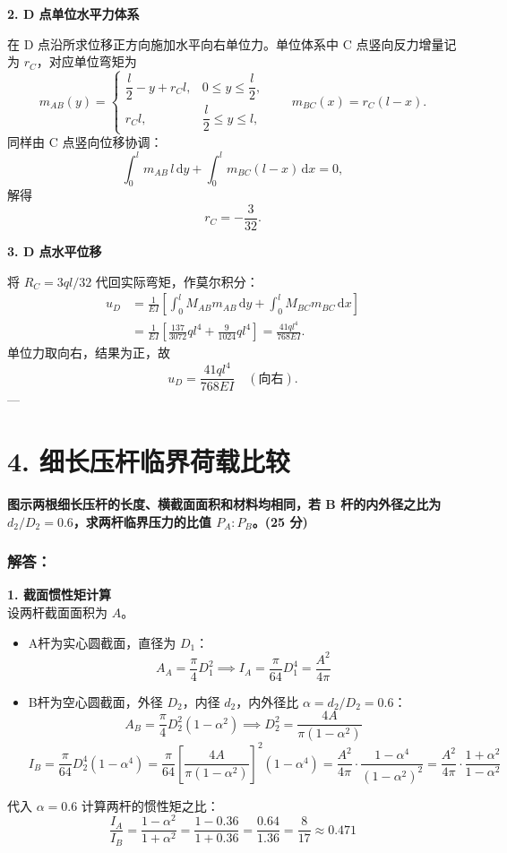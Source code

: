 \documentclass[11pt,a4paper]{ctexrep}
\newcommand{\diff}{\,\mathrm{d}}
\begin{document}
{\textbf{2. D 点单位水平力体系}

在 D 点沿所求位移正方向施加水平向右单位力。单位体系中 C 点竖向反力增量记为 $r_C$，对应单位弯矩为
\[
    m_{AB}(y)=
    \begin{cases}
        \dfrac l2-y+r_C l, & 0\le y\le \dfrac l2,\\[4pt]
        r_C l, & \dfrac l2\le y\le l,
    \end{cases}
    \qquad
    m_{BC}(x)=r_C(l-x).
\]
同样由 C 点竖向位移协调：
\[
\int_0^l m_{AB}\,l\diff y+\int_0^l m_{BC}(l-x)\diff x=0,
\]
解得
\[
    r_C=-\frac{3}{32}.
\]

\textbf{3. D 点水平位移}

将 $R_C=3ql/32$ 代回实际弯矩，作莫尔积分：
\[
\begin{aligned}
u_D
&=\frac1{EI}\left[
\int_0^l M_{AB}m_{AB}\diff y+
\int_0^l M_{BC}m_{BC}\diff x
\right]\\
&=\frac1{EI}\left[
\frac{137}{3072}ql^4+\frac{9}{1024}ql^4
\right]
=\frac{41ql^4}{768EI}.
\end{aligned}
\]
单位力取向右，结果为正，故
\[
    u_D=\frac{41ql^4}{768EI}\quad(\text{向右}).
\]
---

\section*{4. 细长压杆临界荷载比较}

\textbf{图示两根细长压杆的长度、横截面面积和材料均相同，若 B 杆的内外径之比为 $d_2/D_2 = 0.6$，求两杆临界压力的比值 $P_A : P_B$。(25 分)}

\subsubsection*{解答：}

\textbf{1. 截面惯性矩计算} \\
设两杆截面面积为 $A$。
\begin{itemize}
    \item A杆为实心圆截面，直径为 $D_1$：
          \[
              A_A = \frac{\pi}{4} D_1^2 \implies I_A = \frac{\pi}{64} D_1^4 = \frac{A^2}{4\pi}
          \]
    \item B杆为空心圆截面，外径 $D_2$，内径 $d_2$，内外径比 $\alpha = d_2/D_2 = 0.6$：
          \[
              A_B = \frac{\pi}{4} D_2^2(1 - \alpha^2) \implies D_2^2 = \frac{4 A}{\pi (1 - \alpha^2)}
          \]
          \[
              I_B = \frac{\pi}{64} D_2^4(1 - \alpha^4) = \frac{\pi}{64} \left[ \frac{4 A}{\pi (1 - \alpha^2)} \right]^2 (1 - \alpha^4) = \frac{A^2}{4\pi} \cdot \frac{1 - \alpha^4}{(1 - \alpha^2)^2} = \frac{A^2}{4\pi} \cdot \frac{1 + \alpha^2}{1 - \alpha^2}
          \]
\end{itemize}
代入 $\alpha = 0.6$ 计算两杆的惯性矩之比：
\[
    \frac{I_A}{I_B} = \frac{1 - \alpha^2}{1 + \alpha^2} = \frac{1 - 0.36}{1 + 0.36} = \frac{0.64}{1.36} = \frac{8}{17} \approx 0.471
\]

}
\end{document}
